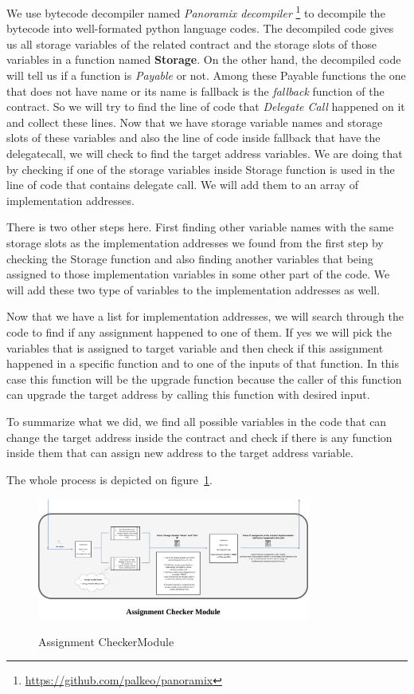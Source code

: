 We use bytecode decompiler named \textit{Panoramix decompiler} \footnote{\url{https://github.com/palkeo/panoramix}} to decompile the bytecode into well-formated python language codes. The decompiled code gives us all storage variables of the related contract and the storage slots of those variables in a function named \textbf{Storage}. On the other hand, the decompiled code will tell us if a function is \textit{Payable} or not. Among these Payable functions the one that does not have name or its name is fallback is the \textit{fallback} function of the contract. So we will try to find the line of code that \textit{Delegate Call} happened on it and collect these lines. Now that we have storage variable names and storage slots of these variables and also the line of code inside fallback that have the delegatecall, we will check to find the target address variables. We are doing that by checking if one of the storage variables inside Storage function is used in the line of code that contains delegate call. We will add them to an array of implementation addresses.

There is two other steps here. First finding other variable names with the same storage slots as the implementation addresses we found from the first step by checking the Storage function and also finding another variables that being assigned to those implementation variables in some other part of the code. We will add these two type of variables to the implementation addresses as well.

Now that we have a list for implementation addresses, we will search through the code to find if any assignment happened to one of them. If yes we will pick the variables that is assigned to target variable and then check if this assignment happened in a specific function and to one of the inputs of that function. In this case this function will be the upgrade function because the caller of this function can upgrade the target address by calling this function with desired input. 

To summarize what we did, we find all possible variables in the code that can change the target address inside the contract and check if there is any function inside them that can assign new address to the target address variable.

The whole process is depicted on figure~\ref{assignmentFinder}.

\begin{figure}[t]
  \includegraphics[width=0.8\textwidth]{figures/Assignment_finder.png}\label{assignmentFinder}
  \caption{Assignment CheckerModule}
\end{figure}



